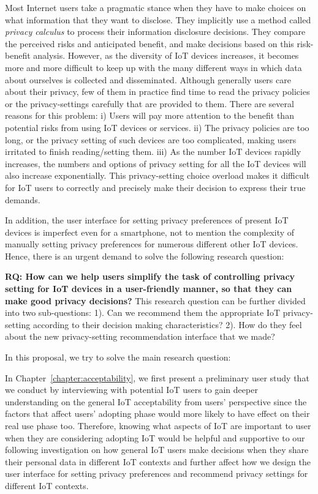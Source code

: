 Most Internet users take a pragmatic stance when they have to make choices on what information that they want to disclose. They implicitly use a method called \textit{privacy calculus} to process their information disclosure decisions. They compare the perceived risks and anticipated benefit, and make decisions based on this risk-benefit analysis. However, as the diversity of IoT devices increases, it becomes more and more difficult to keep up with the many different ways in which data about ourselves is collected and disseminated. Although generally users care about their privacy, few of them in practice find time to read the privacy policies or the privacy-settings carefully that are provided to them. There are several reasons for this problem: i) Users will pay more attention to the benefit than potential risks from using IoT devices or services. ii) The privacy policies are too long, or the privacy setting of such devices are too complicated, making users irritated to finish reading/setting them. iii) As the number IoT devices rapidly increases, the numbers and options of privacy setting for all the IoT devices will also increase exponentially. This privacy-setting choice overload makes it difficult for IoT users to correctly and precisely make their decision to express their true demands. 

In addition, the user interface for setting privacy preferences of present IoT devices is imperfect even for a smartphone, not to mention the complexity of manually setting privacy preferences for numerous different other IoT devices. Hence, there is an urgent demand to solve the following research question: 

\textbf{RQ: How can we help users simplify the task of controlling privacy setting for IoT devices in a user-friendly manner, so that they can make good privacy decisions?} This research question can be further divided into two sub-questions: 1). Can we recommend them the appropriate IoT privacy-setting according to their decision making characteristics? 2). How do they feel about the new privacy-setting recommendation interface that we made?

In this proposal, we try to solve the main research question:

In Chapter~\ref{chapter:acceptability}, we first present a preliminary user study that we conduct by interviewing with potential IoT users to gain deeper understanding on the general IoT acceptability from users' perspective since the factors that affect users' adopting phase would more likely to have effect on their real use phase too. Therefore, knowing what aspects of IoT are important to user when they are considering adopting IoT would be helpful and supportive to our following investigation on how general IoT users make decisions when they share their personal data in different IoT contexts and further affect how we design the user interface for setting privacy preferences and recommend privacy settings for different IoT contexts.
	
